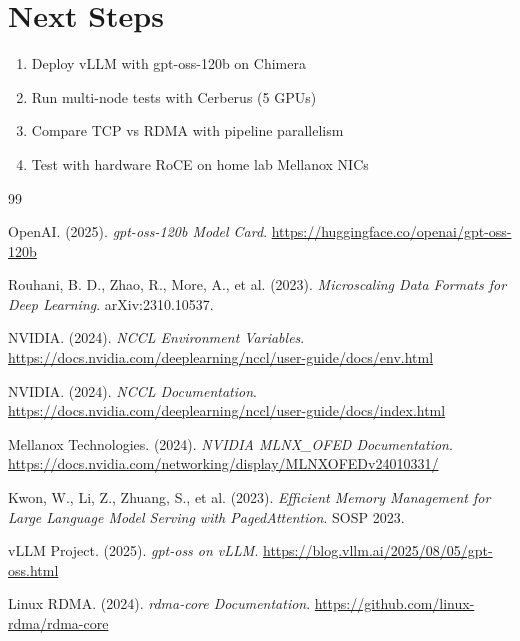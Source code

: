 \documentclass[10pt,letterpaper]{article}
\begin{document}
\section{Next Steps}

\begin{enumerate}[noitemsep]
    \item Deploy vLLM with gpt-oss-120b on Chimera
    \item Run multi-node tests with Cerberus (5 GPUs)
    \item Compare TCP vs RDMA with pipeline parallelism
    \item Test with hardware RoCE on home lab Mellanox NICs
\end{enumerate}

\begin{thebibliography}{99}

OpenAI. (2025). \textit{gpt-oss-120b Model Card}. \url{https://huggingface.co/openai/gpt-oss-120b}

Rouhani, B. D., Zhao, R., More, A., et al. (2023). \textit{Microscaling Data Formats for Deep Learning}. arXiv:2310.10537.

NVIDIA. (2024). \textit{NCCL Environment Variables}. \url{https://docs.nvidia.com/deeplearning/nccl/user-guide/docs/env.html}

NVIDIA. (2024). \textit{NCCL Documentation}. \url{https://docs.nvidia.com/deeplearning/nccl/user-guide/docs/index.html}

Mellanox Technologies. (2024). \textit{NVIDIA MLNX\_OFED Documentation}. \url{https://docs.nvidia.com/networking/display/MLNXOFEDv24010331/}

Kwon, W., Li, Z., Zhuang, S., et al. (2023). \textit{Efficient Memory Management for Large Language Model Serving with PagedAttention}. SOSP 2023.

vLLM Project. (2025). \textit{gpt-oss on vLLM}. \url{https://blog.vllm.ai/2025/08/05/gpt-oss.html}

Linux RDMA. (2024). \textit{rdma-core Documentation}. \url{https://github.com/linux-rdma/rdma-core}

\end{thebibliography}
\end{document}
